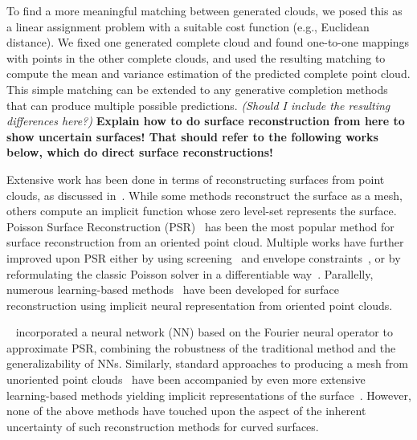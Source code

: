 To find a more meaningful matching between generated clouds, we posed this as a linear assignment problem with a suitable cost function (e.g., Euclidean distance). We fixed one generated complete cloud and found one-to-one mappings with points in the other complete clouds, and used the resulting matching to compute the mean and variance estimation of the predicted complete point cloud. This simple matching can be extended to any generative completion methods that can produce multiple possible predictions. \textit{\color{red}(Should I include the resulting differences here?)} \textbf{\color{orange} Explain how to do surface reconstruction from here to show uncertain surfaces! That should refer to the following works below, which do direct surface reconstructions!}
 
Extensive work has been done in terms of reconstructing surfaces from point clouds, as discussed in~\cite{SurveyReconPC1, SurveyReconPC2}. While some methods reconstruct the surface as a mesh, others compute an implicit function whose zero level-set represents the surface. Poisson Surface Reconstruction (PSR)~\cite{PSR} has been the most popular method for surface reconstruction from an oriented point cloud. Multiple works have further improved upon PSR either by using screening~\cite{ScreenedPSR} and envelope constraints~\cite{PSREnv}, or by reformulating the classic Poisson solver in a differentiable way~\cite{DiffPSR}. Parallelly, numerous learning-based methods~\cite{IGR, SIREN, IDF} have been developed for surface reconstruction using implicit neural representation from oriented point clouds.

~\cite{nPSR} incorporated a neural network (NN) based on the Fourier neural operator to approximate PSR, combining the robustness of the traditional method and the generalizability of NNs. Similarly, standard approaches to producing a mesh from unoriented point clouds~\cite{iPSR, ParamGauss} have been accompanied by even more extensive learning-based methods yielding implicit representations of the surface~\cite{SAL, PredPrior, SparseSurf, POCO, P2Surf, DiGS, SALD, NeuralHessian}. However, none of the above methods have touched upon the aspect of the inherent uncertainty of such reconstruction methods for curved surfaces.

